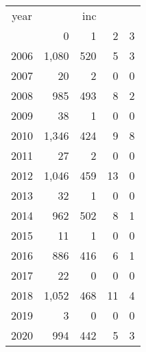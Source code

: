 \footnotesize\begin{tabular}[t]{lrrrr}
\toprule
\multicolumn{1}{c}{year} & \multicolumn{4}{c}{inc} \\
\cmidrule(l{3pt}r{3pt}){1-1} \cmidrule(l{3pt}r{3pt}){2-5}
  & 0 & 1 & 2 & 3\\
\midrule
2006 & 1,080 & 520 & 5 & 3\\
2007 & 20 & 2 & 0 & 0\\
2008 & 985 & 493 & 8 & 2\\
2009 & 38 & 1 & 0 & 0\\
2010 & 1,346 & 424 & 9 & 8\\
2011 & 27 & 2 & 0 & 0\\
2012 & 1,046 & 459 & 13 & 0\\
2013 & 32 & 1 & 0 & 0\\
2014 & 962 & 502 & 8 & 1\\
2015 & 11 & 1 & 0 & 0\\
2016 & 886 & 416 & 6 & 1\\
2017 & 22 & 0 & 0 & 0\\
2018 & 1,052 & 468 & 11 & 4\\
2019 & 3 & 0 & 0 & 0\\
2020 & 994 & 442 & 5 & 3\\
\bottomrule
\end{tabular}
